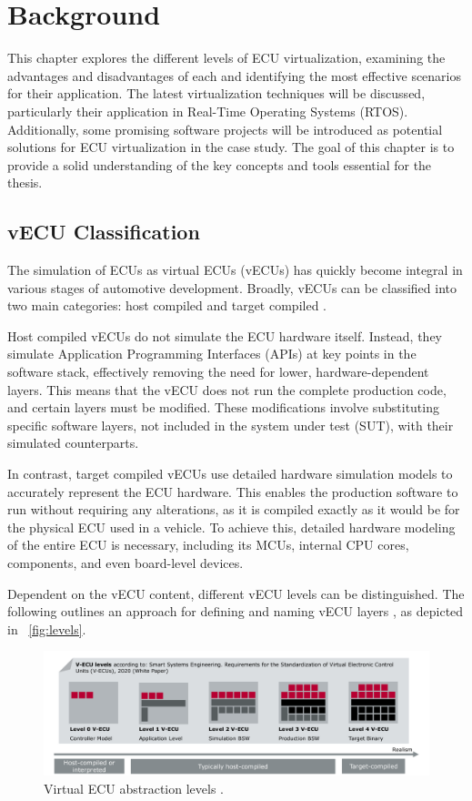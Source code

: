
\chapter{Background}\label{chapter:Background}


This chapter explores the different levels of ECU virtualization, examining the advantages and disadvantages of each and identifying the most effective scenarios for their application. The latest virtualization techniques will be discussed, particularly their application in Real-Time Operating Systems (RTOS). Additionally, some promising software projects will be introduced as potential solutions for ECU virtualization in the case study. The goal of this chapter is to provide a solid understanding of the key concepts and tools essential for the thesis.

\section{vECU Classification}
The simulation of ECUs as virtual ECUs (vECUs) has quickly become integral in various stages of automotive development. Broadly, vECUs can be classified into two main categories: host compiled and target compiled \cite{synopsys2023software}.

Host compiled vECUs do not simulate the ECU hardware itself. Instead, they simulate Application Programming Interfaces (APIs) at key points in the software stack, effectively removing the need for lower, hardware-dependent layers. This means that the vECU does not run the complete production code, and certain layers must be modified. These modifications involve substituting specific software layers, not included in the system under test (SUT), with their simulated counterparts.

In contrast, target compiled vECUs use detailed hardware simulation models to accurately represent the ECU hardware. This enables the production software to run without requiring any alterations, as it is compiled exactly as it would be for the physical ECU used in a vehicle. To achieve this, detailed hardware modeling of the entire ECU is necessary, including its MCUs, internal CPU cores, components, and even board-level devices.

Dependent on the vECU content, different vECU levels can be distinguished. The following outlines an approach for defining and naming vECU layers \cite{smartse2020}, as depicted in ~\autoref{fig:levels}.
\begin{figure}[htpb]
  \centering
  \includegraphics[width=1\textwidth]{figures/levels}
  \caption{Virtual ECU abstraction levels \cite{wenzler2023}.} \label{fig:levels}
\end{figure}

